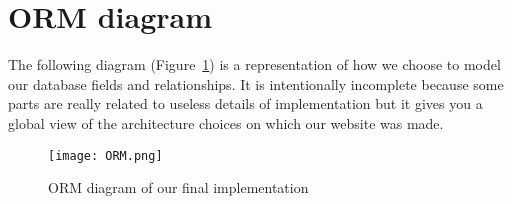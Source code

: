 \section{ORM diagram}
\label{sec:ORM diagram}

The following diagram (Figure~\ref{fig:ORM_diagram}) is a representation of how
we choose to model our database fields and relationships. It is intentionally
incomplete because some parts are really related to useless details of
implementation but it gives you a global view of the architecture choices
on which our website was made. \newline

\begin{figure}[!ht]
    \centering
    \texttt{[image: ORM.png]}
    \caption{ORM diagram of our final implementation}
    \label{fig:ORM_diagram}
\end{figure}
\FloatBarrier
